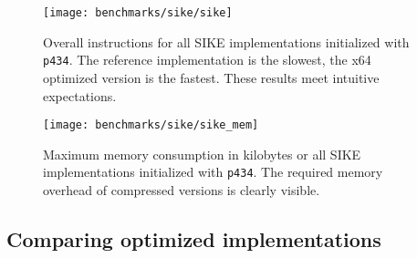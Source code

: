 \begin{figure}[H]
  \centering
  \texttt{[image: benchmarks/sike/sike]}
  \caption[Overall instructions \gls{SIKE}]
  {Overall instructions for all \gls{SIKE} implementations initialized with \texttt{p434}. The reference implementation is the slowest, the x64 optimized version is the fastest. These results meet intuitive expectations.}
  \label{fig:results_sike}
\end{figure}

\begin{figure}[H]
  \centering
  \texttt{[image: benchmarks/sike/sike\_mem]}
  \caption[Maximum memory consumption \gls{SIKE}]
  {Maximum memory consumption in kilobytes or all \gls{SIKE} implementations initialized with \texttt{p434}. The required memory overhead of compressed versions is clearly visible.}
  \label{fig:results_sike_mem}
\end{figure}

\subsection{Comparing optimized implementations}\label{sec:analysis_optimized}

